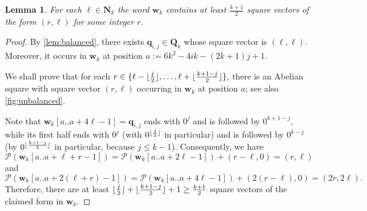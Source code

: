 \documentclass{article}
\theoremstyle{plain}
\newtheorem{lemma}[theorem]{Lemma}
\theoremstyle{definition}
\theoremstyle{remark}
\renewcommand{\P}{\mathcal{P}}
\newcommand{\ww}{\mathbf{w}}
\newcommand{\qq}{\mathbf{q}}
\newcommand{\QQ}{\mathbf{Q}}
\newcommand{\NN}{\mathbf{N}}
\DeclarePairedDelimiter{\floor}{\lfloor}{\rfloor}
\begin{document}
  \begin{lemma}\label{lem:unbalanced}
  For each $\ell\in \NN_k$ the word $\ww_k$ contains at least $\frac{k+1}{2}$
  square vectors of the form $(r,\ell)$ for some integer $r$.
  \end{lemma}
  \begin{proof}
  By \cref{lem:balanced}, there exists $\qq_{i,j}\in \QQ_k$ whose square vector is $(\ell,\ell)$.
  Moreover, it occurs in $\ww_k$ at position $a := 6k^2-4ik-(2k+1)j+1$.
  
  We shall prove that for each $r\in \{\ell-\floor{\frac{j}{2}},\ldots,\ell+\floor{\frac{k+1-j}{2}}\}$, 
  there is an Abelian square with square vector $(r,\ell)$ occurring in $\ww_k$ at position $a$; see also \cref{fig:unbalanced}.
  
  Note that $\ww_k[a..a+4\ell-1]=\qq_{i,j}$ ends with $0^j$ and is followed by $0^{k+1-j}$,
  while its first half ends with $0^j$ (with $0^{\floor{\frac{j}{2}}}$ in particular) and is followed by $0^{k-j}$
  (by $0^{\floor{\frac{k+1-j}{2}}}$ in particular, because $j\le k-1$). 
  Consequently, we have
  \[\P(\ww_k[a..a+\ell+r-1])=\P(\ww_k[a..a+2\ell-1])+(r-\ell,0)=(r,\ell)\]
  and
  \[\P(\ww_k[a..a+2(\ell+r)-1])=\P(\ww_k[a..a+4\ell-1])+(2(r-\ell),0)=(2r,2\ell).\]
  Therefore, there are at least $\floor{\frac{j}{2}}+\floor{\frac{k+1-j}{2}}+1\ge \frac{k+1}{2}$
  square vectors of the claimed form in $\ww_k$.  
  \end{proof}
\end{document}
